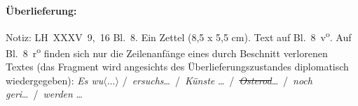 %
%
%
%
%
\frenchspacing%
%
\begin{ledgroupsized}[r]{120mm}%
\footnotesize%
\pstart%
\noindent%
\textbf{Überlieferung:}%
\pend%
\end{ledgroupsized}%
\begin{ledgroupsized}[r]{114mm}%
\footnotesize%
\pstart%
\parindent -6mm%
%
Notiz:
LH~XXXV~9,~16 Bl.~8.
Ein Zettel (8,5 x 5,5 cm).
Text auf Bl.~8~v\textsuperscript{o}.
Auf Bl.~8~r\textsuperscript{o} %
finden sich nur die Zeilenanfänge eines durch Beschnitt verlorenen Textes
(das Fragment wird angesichts des Überlieferungszustandes diplomatisch wiedergegeben): %
\textit{Es wu}$\langle\dots\rangle$
\lbrack/\rbrack\ \textit{ersuchs}\textlangle\dots\textrangle\
\lbrack/\rbrack\ \textit{Künste} \textlangle\dots\textrangle\
\lbrack/\rbrack\ \textit{\sout{Osterod}}\textlangle\dots\textrangle\
\lbrack/\rbrack\ \textit{noch geri}\textlangle\dots\textrangle\
\lbrack/\rbrack\ \textit{werden} \textlangle\dots\textrangle\
\pend%
\end{ledgroupsized}%
%
%
\vspace*{5mm}%
